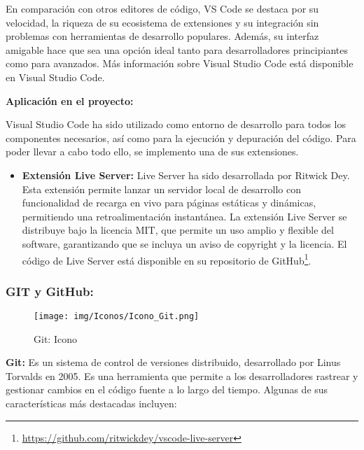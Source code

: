 \documentclass[a4paper, 12pt]{book}
\begin{document}
    En comparación con otros editores de código, VS Code se destaca por su velocidad, la riqueza de su ecosistema de extensiones y su integración sin problemas con herramientas de desarrollo populares. Además, su interfaz amigable hace que sea una opción ideal tanto para desarrolladores principiantes como para avanzados. Más información sobre Visual Studio Code está disponible en Visual Studio Code.
    
    \vspace{0.5cm} %
    \textbf{Aplicación en el proyecto:} 
    
    Visual Studio Code ha sido utilizado como entorno de desarrollo para todos los componentes necesarios, así como para la ejecución y depuración del código. Para poder llevar a cabo todo ello, se implemento una de sus extensiones.
    
    \begin{itemize}   
        \begin{figure}[H]
            \centering
            \texttt{[image: img/Iconos/Icono\_Live\_Server.png]}
            \caption{Live Server: Icono}
            \label{fig:enter-label}
        \end{figure}
        \item \textbf{Extensión Live Server:} Live Server ha sido desarrollada por Ritwick Dey. Esta extensión permite lanzar un servidor local de desarrollo con funcionalidad de recarga en vivo para páginas estáticas y dinámicas, permitiendo una retroalimentación instantánea. La extensión Live Server se distribuye bajo la licencia MIT, que permite un uso amplio y flexible del software, garantizando que se incluya un aviso de copyright y la licencia. El código de Live Server está disponible en su repositorio de GitHub\footnote{\url{https://github.com/ritwickdey/vscode-live-server}}.  
    \end{itemize}
    
    
    \subsubsection{GIT y GitHub:}
        \begin{figure}[H]
            \centering
            \texttt{[image: img/Iconos/Icono\_Git.png]}
            \caption{Git: Icono}
            \label{fig:enter-label}
         \end{figure}
        
        \textbf{Git:} Es un sistema de control de versiones distribuido, desarrollado por Linus Torvalds en 2005. Es una herramienta que permite a los desarrolladores rastrear y gestionar cambios en el código fuente a lo largo del tiempo. Algunas de sus características más destacadas incluyen:
    
\end{document}
